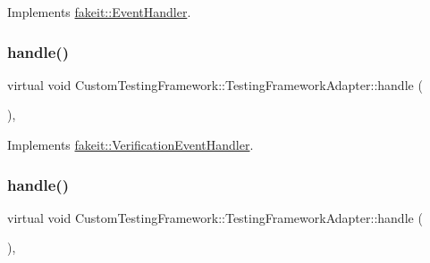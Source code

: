 Implements \mbox{\hyperlink{structfakeit_1_1EventHandler_a4de5ad05e5de73e36f4b2cede6d8efd3}{fakeit\+::\+Event\+Handler}}.

\mbox{\label{classCustomTestingFramework_1_1TestingFrameworkAdapter_af3a8d3a24116d36fff1dc495c84cfb2f}} 
\subsubsection{\texorpdfstring{handle()}{handle()}\hspace{0.1cm}{\footnotesize\ttfamily [2/3]}}
{\footnotesize\ttfamily virtual void Custom\+Testing\+Framework\+::\+Testing\+Framework\+Adapter\+::handle (\begin{DoxyParamCaption}\item[{const \mbox{\hyperlink{structfakeit_1_1SequenceVerificationEvent}{Sequence\+Verification\+Event}} \&}]{ }\end{DoxyParamCaption})\hspace{0.3cm}{\ttfamily [inline]}, {\ttfamily [virtual]}}



Implements \mbox{\hyperlink{structfakeit_1_1VerificationEventHandler_adf355a9888bc2bf78ce0e1219bfb1379}{fakeit\+::\+Verification\+Event\+Handler}}.

\mbox{\label{classCustomTestingFramework_1_1TestingFrameworkAdapter_a57f8533951a9dbe0e4bf013de72cf325}} 
\subsubsection{\texorpdfstring{handle()}{handle()}\hspace{0.1cm}{\footnotesize\ttfamily [3/3]}}
{\footnotesize\ttfamily virtual void Custom\+Testing\+Framework\+::\+Testing\+Framework\+Adapter\+::handle (\begin{DoxyParamCaption}\item[{const \mbox{\hyperlink{structfakeit_1_1NoMoreInvocationsVerificationEvent}{No\+More\+Invocations\+Verification\+Event}} \&}]{ }\end{DoxyParamCaption})\hspace{0.3cm}{\ttfamily [inline]}, {\ttfamily [virtual]}}



